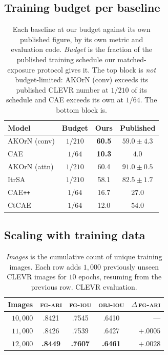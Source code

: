 \subsection{Training budget per baseline}

\begin{table}[!tb]
\centering
\small
\begin{tabular}{l c c c}
\toprule
Model & Budget & Ours & Published \\
\midrule
AKOrN (conv) & $1/210$ & \textbf{60.5} & $59.0\pm4.3$ \\
CAE          & $1/64$  & \textbf{10.3} & $4.0$ \\
\midrule
AKOrN (attn) & $1/210$ & 60.4 & $91.0\pm0.5$ \\
ItrSA        & $1/210$ & 58.1 & $82.5\pm1.7$ \\
CAE\texttt{++} & $1/64$ & 16.7 & $27.0$ \\
CtCAE        & $1/64$  & 12.0 & $54.0$ \\
\bottomrule
\end{tabular}
\caption{Each baseline at our budget against its own published figure, by its own metric and
evaluation code. \emph{Budget} is the fraction of the published training schedule our
matched-exposure protocol gives it. The top block is \emph{not} budget-limited: AKOrN (conv)
exceeds its published CLEVR number at $1/210$ of its schedule and CAE exceeds its own at $1/64$.
The bottom block is.}
\label{tab:s-budget}
\end{table}

\subsection{Scaling with training data}

\begin{table}[!tb]
\centering
\small
\begin{tabular}{r ccc r}
\toprule
Images & \textsc{fg-ari} & \textsc{fg-iou} & \textsc{obj-iou} & $\Delta$\,\textsc{fg-ari} \\
\midrule
$10{,}000$ & .8421 & .7545 & .6410 & --- \\
$11{,}000$ & .8426 & .7539 & .6427 & $+.0005$ \\
$12{,}000$ & \textbf{.8449} & \textbf{.7607} & \textbf{.6461} & $+.0028$ \\
\bottomrule
\end{tabular}
\caption{\emph{Images} is the cumulative count of unique training images. Each row adds $1{,}000$
previously unseen CLEVR images for $10$ epochs, resuming from the previous row. CLEVR
evaluation.}
\label{tab:s-scaling}
\end{table}
